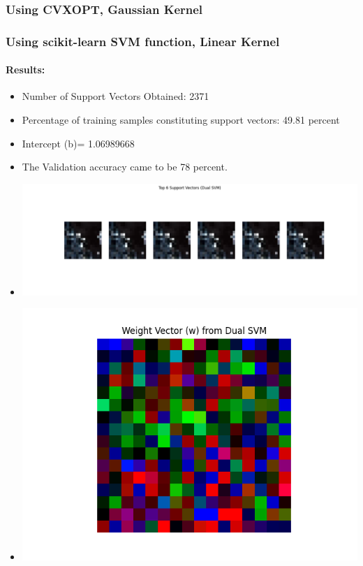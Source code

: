 \documentclass[12pt,a4paper]{article}
\begin{document}
\subsubsection{Using CVXOPT, Gaussian Kernel}


\subsubsection{Using scikit-learn SVM function, Linear Kernel}

\paragraph{Results:}
\begin{itemize}
    \item Number of Support Vectors Obtained: 2371
    \item Percentage of training samples constituting support vectors: 49.81 percent
    \item Intercept (b)= 1.06989668
    \item The Validation accuracy came to be 78 percent.
    \item \includegraphics[width=\textwidth]{Assignment 2/q2/top_6_support_vectors_dual cvxopt linear.png}
    \item \includegraphics[width=\textwidth]{Assignment 2/q2/weight_vector_dual cvxopt linear.png}
\end{itemize}
\end{document}
